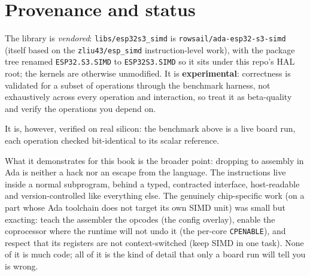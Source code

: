 \section{Provenance and status}

The library is \emph{vendored}: \texttt{libs/esp32s3\_simd} is
\texttt{rowsail/ada-esp32-s3-simd} (itself based on the \texttt{zliu43/esp\_simd}
instruction-level work), with the package tree renamed \texttt{ESP32.S3.SIMD} to
\texttt{ESP32S3.SIMD} so it sits under this repo's HAL root; the kernels are
otherwise unmodified. It is \textbf{experimental}: correctness is validated for a
subset of operations through the benchmark harness, not exhaustively across every
operation and interaction, so treat it as beta-quality and verify the operations you
depend on.

It is, however, verified on real silicon: the benchmark above is a live board run,
each operation checked bit-identical to its scalar reference.

What it demonstrates for this book is the broader point: dropping to assembly in Ada
is neither a hack nor an escape from the language. The instructions live inside a
normal subprogram, behind a typed, contracted interface, host-readable and
version-controlled like everything else. The genuinely chip-specific work (on a
part whose Ada toolchain does not target its own SIMD unit) was small but exacting:
teach the assembler the opcodes (the config overlay), enable the coprocessor where
the runtime will not undo it (the per-core \texttt{CPENABLE}), and respect that its
registers are not context-switched (keep SIMD in one task). None of it is much code;
all of it is the kind of detail that only a board run will tell you is wrong.
